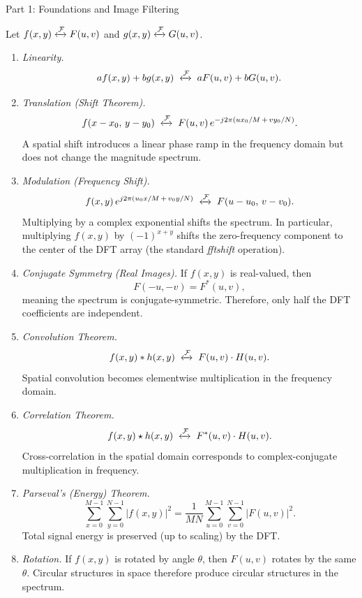 \documentclass[letterpaper]{article}
\begin{document}
\begin{notes}{Part 1: Foundations and Image Filtering}

Let $f(x,y)\xleftrightarrow{\mathcal{F}} F(u,v)$ and $g(x,y)\xleftrightarrow{\mathcal{F}} G(u,v)$.

\begin{enumerate}
    \item \textit{Linearity.}
    $$af(x,y) + bg(x,y) \;\xleftrightarrow{\mathcal{F}}\; aF(u,v) + bG(u,v).$$
    
    \item \textit{Translation (Shift Theorem).}
    $$f(x-x_0,\, y-y_0) \;\xleftrightarrow{\mathcal{F}}\; F(u,v)\, e^{-j2\pi(ux_0/M \,+\, vy_0/N)}.$$
    A spatial shift introduces a linear phase ramp in the frequency domain but does not change the magnitude spectrum.
    
    \item \textit{Modulation (Frequency Shift).}
    $$f(x,y)\, e^{j2\pi(u_0x/M \,+\, v_0y/N)} \;\xleftrightarrow{\mathcal{F}}\; F(u-u_0,\, v-v_0).$$
    Multiplying by a complex exponential shifts the spectrum. In particular, multiplying $f(x,y)$ by $(-1)^{x+y}$ shifts the zero-frequency component to the center of the DFT array (the standard \emph{fftshift} operation).
    
    \item \textit{Conjugate Symmetry (Real Images).}
    If $f(x,y)$ is real-valued, then
    $$F(-u,-v) = F^*(u,v),$$
    meaning the spectrum is conjugate-symmetric. Therefore, only half the DFT coefficients are independent.
    
    \item \textit{Convolution Theorem.}
    $$f(x,y) * h(x,y) \;\xleftrightarrow{\mathcal{F}}\; F(u,v)\cdot H(u,v).$$
    Spatial convolution becomes elementwise multiplication in the frequency domain.
    
    \item \textit{Correlation Theorem.}
    $$f(x,y)\star h(x,y) \;\xleftrightarrow{\mathcal{F}}\; F^*(u,v)\cdot H(u,v).$$
    Cross-correlation in the spatial domain corresponds to complex-conjugate multiplication in frequency.
    
    \item \textit{Parseval's (Energy) Theorem.}
    $$\sum_{x=0}^{M-1}\sum_{y=0}^{N-1}|f(x,y)|^2 = \frac{1}{MN}\sum_{u=0}^{M-1}\sum_{v=0}^{N-1}|F(u,v)|^2.$$
    Total signal energy is preserved (up to scaling) by the DFT.
    
    \item \textit{Rotation.}
    If $f(x,y)$ is rotated by angle $\theta$, then $F(u,v)$ rotates by the same $\theta$. Circular structures in space therefore produce circular structures in the spectrum.
    

\end{enumerate}
\end{notes}
\end{document}
